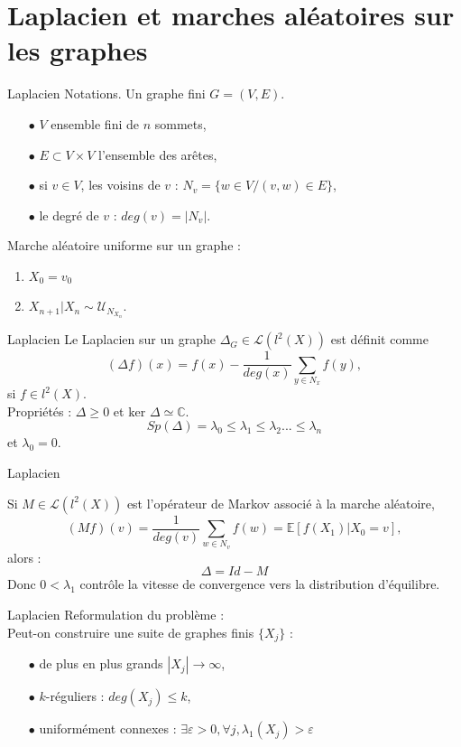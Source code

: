 \section{Laplacien et marches aléatoires sur les graphes}

\begin{frame}{Laplacien}
Notations. Un graphe fini $G=(V,E)$.
 
\begin{itemize}
\item[$\bullet$] $V$ ensemble fini de $n$ sommets,
\item[$\bullet$] $E\subset V\times V$ l'ensemble des arêtes,
\item[$\bullet$] si $v\in V$, les voisins de $v$ : $N_v=\{w\in V / (v,w)\in E\}$,
\item[$\bullet$] le degré de $v$ : $deg(v)=|N_v|$.
\end{itemize}
Marche aléatoire uniforme sur un graphe :
\begin{enumerate}
\item $X_0=v_0$
\item $X_{n+1}|X_n\sim \mathcal U_{N_{X_n}}$. \\
\end{enumerate}
\end{frame}

\begin{frame}{Laplacien}
Le Laplacien sur un graphe $\Delta_G\in \mathcal L(l^2(X))$ est définit comme
\[(\Delta f) (x) = f(x) - \frac{1}{deg(x)}\sum_{y\in N_x} f(y) ,\]
si $f\in l^2(X)$.\\

Propriétés : $\Delta\geq 0$ et $\text{ker }\Delta\simeq \mathbb C $.\\

\[Sp(\Delta)= \lambda_0\leq \lambda_1\leq \lambda_2...\leq \lambda_n\]
et $\lambda_0=0$.
\end{frame}

\begin{frame}{Laplacien}

Si $M\in\mathcal L(l^2(X))$ est l'opérateur de Markov associé à la marche aléatoire, 
\[(Mf)(v)=\frac{1}{deg(v)}\sum_{w \in N_v} f(w) = \mathbb E[f(X_1)|X_0=v],\]
alors : \[\Delta=Id-M\]
Donc $0<\lambda_1$ contrôle la vitesse de convergence vers la distribution d'équilibre.
\end{frame}

\begin{frame}{Laplacien}
Reformulation du problème :\\
Peut-on construire une suite de graphes finis $\{X_j\}$ :
\begin{itemize}
\item[$\bullet$] de plus en plus grands $|X_j|\rightarrow \infty$,
\item[$\bullet$] $k$-réguliers : $deg(X_j)\leq k$,
\item[$\bullet$] uniformément connexes : $\exists\varepsilon>0, \forall j, \lambda_1(X_j)>\varepsilon$ 
\end{itemize}
\end{frame}

